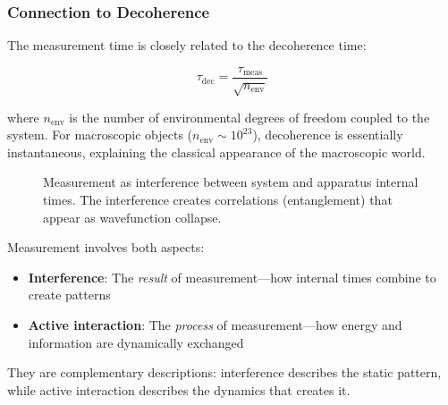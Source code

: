 \subsubsection{Connection to Decoherence}

The measurement time is closely related to the decoherence time:

\begin{equation}
    \tau_{\text{dec}} = \frac{\tau_{\text{meas}}}{\sqrt{n_{\text{env}}}}
\end{equation}

where $n_{\text{env}}$ is the number of environmental degrees of freedom coupled to the system. For macroscopic objects ($n_{\text{env}} \sim 10^{23}$), decoherence is essentially instantaneous, explaining the classical appearance of the macroscopic world.

\begin{figure}[htbp]
\centering
{}
\caption{Measurement as interference between system and apparatus internal times. The interference creates correlations (entanglement) that appear as wavefunction collapse.}
\label{fig:measurement_interference}
\end{figure}

\begin{insight}
Measurement involves both aspects:
\begin{itemize}
    \item \textbf{Interference}: The \textit{result} of measurement—how internal times combine to create patterns
    \item \textbf{Active interaction}: The \textit{process} of measurement—how energy and information are dynamically exchanged
\end{itemize}
They are complementary descriptions: interference describes the static pattern, while active interaction describes the dynamics that creates it.
\end{insight}

